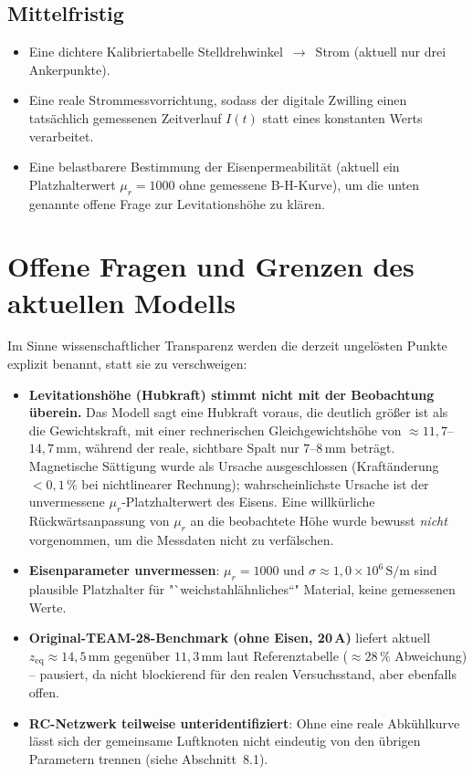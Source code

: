 \documentclass[a4paper,11pt]{article}
\begin{document}
\subsection{Mittelfristig}
\begin{itemize}[nosep]
  \item Eine dichtere Kalibriertabelle Stelldrehwinkel~$\to$~Strom (aktuell
        nur drei Ankerpunkte).
  \item Eine reale Strommessvorrichtung, sodass der digitale Zwilling einen
        tatsächlich gemessenen Zeitverlauf $I(t)$ statt eines konstanten
        Werts verarbeitet.
  \item Eine belastbarere Bestimmung der Eisenpermeabilität (aktuell ein
        Platzhalterwert $\mu_r=1000$ ohne gemessene B-H-Kurve), um die unten
        genannte offene Frage zur Levitationshöhe zu klären.
\end{itemize}

\section{Offene Fragen und Grenzen des aktuellen Modells}

Im Sinne wissenschaftlicher Transparenz werden die derzeit ungelösten Punkte
explizit benannt, statt sie zu verschweigen:

\begin{itemize}[nosep]
  \item \textbf{Levitationshöhe (Hubkraft) stimmt nicht mit der Beobachtung
        überein.} Das Modell sagt eine Hubkraft voraus, die deutlich größer
        ist als die Gewichtskraft, mit einer rechnerischen
        Gleichgewichtshöhe von $\approx 11{,}7$--$14{,}7\,\mathrm{mm}$,
        während der reale, sichtbare Spalt nur $7$--$8\,\mathrm{mm}$
        beträgt. Magnetische Sättigung wurde als Ursache
        ausgeschlossen (Kraftänderung $<0{,}1\,\%$ bei nichtlinearer
        Rechnung); wahrscheinlichste Ursache ist der unvermessene
        $\mu_r$-Platzhalterwert des Eisens. Eine willkürliche
        Rückwärtsanpassung von $\mu_r$ an die beobachtete Höhe wurde
        bewusst \emph{nicht} vorgenommen, um die Messdaten nicht zu
        verfälschen.
  \item \textbf{Eisenparameter unvermessen}: $\mu_r=1000$ und
        $\sigma\approx1{,}0\times10^6\,\mathrm{S/m}$ sind plausible
        Platzhalter für "`weichstahlähnliches“" Material, keine gemessenen
        Werte.
  \item \textbf{Original-TEAM-28-Benchmark (ohne Eisen, 20\,A)} liefert
        aktuell $z_{\mathrm{eq}}\approx14{,}5\,\mathrm{mm}$ gegenüber
        $11{,}3\,\mathrm{mm}$ laut Referenztabelle ($\approx28\,\%$
        Abweichung) -- pausiert, da nicht blockierend für den realen
        Versuchsstand, aber ebenfalls offen.
  \item \textbf{RC-Netzwerk teilweise unteridentifiziert}: Ohne eine reale
        Abkühlkurve lässt sich der gemeinsame Luftknoten nicht eindeutig
        von den übrigen Parametern trennen (siehe Abschnitt~8.1).
\end{itemize}
\end{document}
